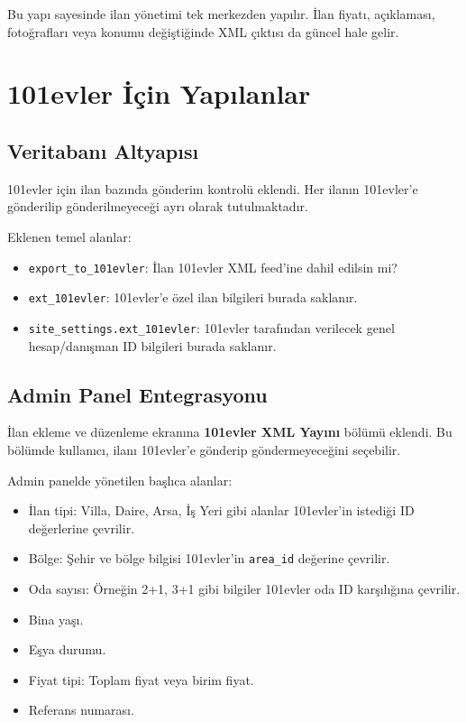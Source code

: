 \documentclass[11pt,a4paper]{article}
\newcommand{\portal}[1]{\textbf{#1}}
\newcommand{\code}[1]{\texttt{#1}}
\begin{document}
Bu yapı sayesinde ilan yönetimi tek merkezden yapılır. İlan fiyatı, açıklaması, fotoğrafları veya konumu değiştiğinde XML çıktısı da güncel hale gelir.

\section{101evler İçin Yapılanlar}

\subsection{Veritabanı Altyapısı}

101evler için ilan bazında gönderim kontrolü eklendi. Her ilanın 101evler'e gönderilip gönderilmeyeceği ayrı olarak tutulmaktadır.

Eklenen temel alanlar:

\begin{itemize}
  \item \code{export\_to\_101evler}: İlan 101evler XML feed'ine dahil edilsin mi?
  \item \code{ext\_101evler}: 101evler'e özel ilan bilgileri burada saklanır.
  \item \code{site\_settings.ext\_101evler}: 101evler tarafından verilecek genel hesap/danışman ID bilgileri burada saklanır.
\end{itemize}

\subsection{Admin Panel Entegrasyonu}

İlan ekleme ve düzenleme ekranına \portal{101evler XML Yayını} bölümü eklendi. Bu bölümde kullanıcı, ilanı 101evler'e gönderip göndermeyeceğini seçebilir.

Admin panelde yönetilen başlıca alanlar:

\begin{itemize}
  \item İlan tipi: Villa, Daire, Arsa, İş Yeri gibi alanlar 101evler'in istediği ID değerlerine çevrilir.
  \item Bölge: Şehir ve bölge bilgisi 101evler'in \code{area\_id} değerine çevrilir.
  \item Oda sayısı: Örneğin 2+1, 3+1 gibi bilgiler 101evler oda ID karşılığına çevrilir.
  \item Bina yaşı.
  \item Eşya durumu.
  \item Fiyat tipi: Toplam fiyat veya birim fiyat.
  \item Referans numarası.
\end{itemize}
\end{document}
